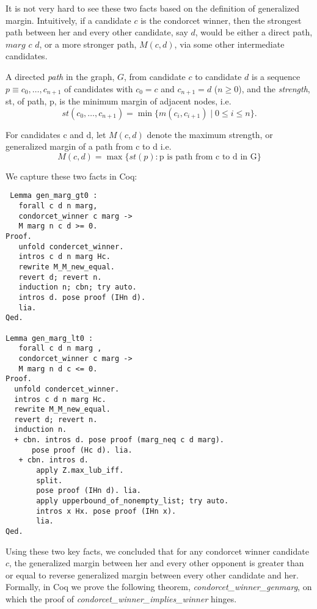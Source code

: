  
 It is not very hard to see these two facts based on the definition of generalized margin. Intuitively, 
 if a candidate $c$ is the condorcet winner, then the strongest path between her and every other 
 candidate, say $d$,  would be either a direct path, $marg$ $c$ $d$, or a more stronger path, $M (c, d)$, 
 via some other intermediate candidates. 
  
 \begin{displayquote}
 A directed \emph{path} in the graph, $G$, from
candidate $c$ to candidate $d$ is a sequence $p \equiv c_0, \dots, c_{n+1}$
of candidates with $c_0 = c$ and $c_{n+1} = d$ ($n \geq 0$), and the
\emph{strength}, st, of path, p, is the minimum margin of adjacent
nodes, i.e.
\[ st(c_0, \dots, c_{n+1}) = \min \lbrace m (c_i, c_{i+1}) \mid 0
\leq i \leq n \rbrace. \]
\item For candidates c and d, let $M(c, d)$ denote the maximum strength, or generalized margin of a path
	from c to d i.e. 
	\[ M(c, d) = \max \lbrace st (p) : \text{p is path from c to d in G} \rbrace\]
  
   \end{displayquote}
   
 We capture these two facts in Coq:
 
 \begin{verbatim}
 Lemma gen_marg_gt0 :
   forall c d n marg, 
   condorcet_winner c marg -> 
   M marg n c d >= 0.
Proof. 
   unfold condercet_winner.
   intros c d n marg Hc.
   rewrite M_M_new_equal. 
   revert d; revert n.
   induction n; cbn; try auto.
   intros d. pose proof (IHn d).
   lia.
Qed.

Lemma gen_marg_lt0 :
   forall c d n marg , 
   condorcet_winner c marg ->
   M marg n d c <= 0.
Proof.
  unfold condercet_winner.
  intros c d n marg Hc.
  rewrite M_M_new_equal.
  revert d; revert n.
  induction n.
  + cbn. intros d. pose proof (marg_neq c d marg).
      pose proof (Hc d). lia. 
   + cbn. intros d.
       apply Z.max_lub_iff. 
       split.
       pose proof (IHn d). lia.
       apply upperbound_of_nonempty_list; try auto.
       intros x Hx. pose proof (IHn x).
       lia.
Qed.
\end{verbatim}   
 
 Using these two key facts, we concluded that for any condorcet winner candidate $c$, 
 the generalized margin between her and every other opponent is greater than or equal 
 to reverse generalized margin between every other candidate and her.  Formally, 
 in Coq we prove the following theorem, \textit{condorcet\_winner\_genmarg}, on which  the proof of 
 \textit{condorcet\_winner\_implies\_winner} hinges. 
 
